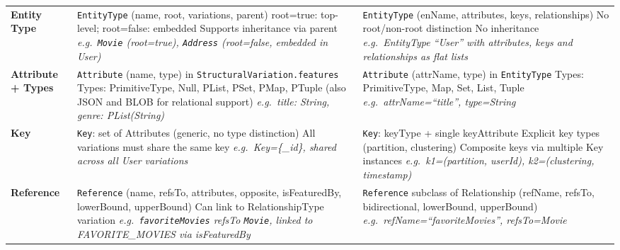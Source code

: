 \begin{longtable}{@{} >{\raggedright\arraybackslash\bfseries}p{} >{\raggedright\arraybackslash}p{}
  >{\raggedright\arraybackslash}p{} @{}}
  Entity Type &
  \texttt{EntityType} (name, root, variations, parent) \newline root=true: top-level; root=false: embedded \newline Supports inheritance via parent
  \newline
  \textit{e.g.\ \texttt{Movie} (root=true), \texttt{Address} (root=false, embedded in User)} &
  \texttt{EntityType} (enName, attributes, keys, relationships) \newline No root/non-root distinction \newline No inheritance \newline
  \textit{e.g.\ EntityType ``User'' with attributes, keys and relationships as flat lists} \\

  Attribute + Types &
  \texttt{Attribute} (name, type) in \texttt{StructuralVariation.features} \newline Types: PrimitiveType, Null, PList, PSet, PMap, PTuple \newline
  (also JSON and BLOB for relational support) \newline
  \textit{e.g.\ title: String, genre: PList(String)} &
  \texttt{Attribute} (attrName, type) in \texttt{EntityType} \newline Types: PrimitiveType, Map, Set, List, Tuple \newline
  \textit{e.g.\ attrName=``title'', type=String} \\

  Key &
  \texttt{Key}: set of Attributes (generic, no type distinction) \newline All variations must share the same key \newline
  \textit{e.g.\ Key=\{\_id\}, shared across all User variations} &
  \texttt{Key}: keyType + single keyAttribute \newline Explicit key types (partition, clustering) \newline Composite keys via multiple Key instances
   \newline
  \textit{e.g.\ k1=(partition, userId), k2=(clustering, timestamp)} \\

  Reference &
  \texttt{Reference} (name, refsTo, attributes, opposite, isFeaturedBy, lowerBound, upperBound) \newline Can link to RelationshipType variation
  \newline
  \textit{e.g.\ \texttt{favoriteMovies} refsTo \texttt{Movie}, linked to FAVORITE\_MOVIES via isFeaturedBy} &
  \texttt{Reference} subclass of Relationship (refName, refsTo, bidirectional, lowerBound, upperBound) \newline
  \textit{e.g.\ refName=``favoriteMovies'', refsTo=Movie} \\


\end{longtable}
